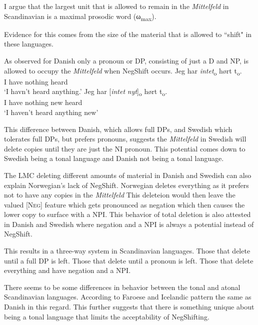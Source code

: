 \documentclass[12pt, letterpaper]{article}
\newcommand{\sub}[1]{\textsubscript{#1}}
\begin{document}
	\ex I argue that the largest unit that is allowed to remain in the \emph{Mittelfeld} in Scandinavian is a maximal prosodic word (ω\sub{max}).
	\z 

\ex Evidence for this comes from the size of the material that is allowed to ``shift" in these languages. 

\ex As observed for Danish only a pronoun or DP, consisting of just a D and NP, is allowed to occupy the \emph{Mittelfeld} when NegShift occurs. 
	\ea 
	\gll Jeg har \textit{intet}\textsubscript{o} hørt t\textsubscript{o}.\\
	I have nothing heard\\
	\glt  `I havn't heard anything.'
	\ex 
	\gll Jeg har [\textit{intet} \textit{nyt}]\textsubscript{o} hørt t\textsubscript{o}.\\
	I have nothing new heard\\
	\glt `I haven't heard anything new'
	\z  	

\ex This difference between Danish, which allows full DPs, and Swedish which tolerates full DPs, but prefers pronouns, suggests the \emph{Mittelfeld} in Swedish will delete copies until they are just the NI pronoun. 
	\ea This potential comes down to Swedish being a tonal language and Danish not being a tonal language.
	\z 

\ex The LMC deleting different amounts of material in Danish and Swedish can also explain Norwegian's lack of NegShift. 
	\ea Norwegian deletes everything as it prefers not to have any copies in the \emph{Mittelfeld}
	\ex This deleteion would then leave the valued [\textsc{Neg}] feature which gets pronounced as negation which then causes the lower copy to surface with a NPI.  
	\ex This behavior of total deletion is also attested in Danish and Swedish where negation and a NPI is always a potential instead of NegShift.
	\z  

\ex This results in a three-way system in Scandinavian languages. 
	\ea Those that delete until a full DP is left.
	\ex Those that delete until a pronoun is left.
	\ex Those that delete everything and have negation and a NPI.
	\z 

\ex There seems to be some differences in behavior between the tonal and atonal Scandinavian languages. 
	\ea According to \citet{thrainssonFaroeseOverviewReference2004,thrainssonSyntaxIcelandic2010} Faroese and Icelandic pattern the same as Danish in this regard. 
	\ex This further suggests that there is something unique about being a tonal language that limits the acceptability of NegShifting. 
	\z 
\end{document}
